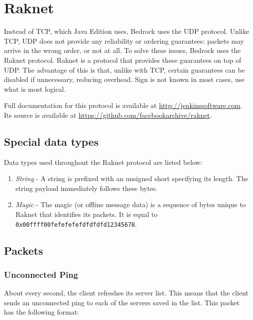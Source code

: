 \chapter{Raknet}\label{chap:raknet}

Instead of TCP, which Java Edition uses, Bedrock uses the UDP protocol.
Unlike TCP, UDP does not provide any reliability or ordering guarantees:
packets may arrive in the wrong order, or not at all. 
To solve these issues, Bedrock uses the Raknet protocol. 
Raknet is a protocol that provides these guarantees on top of UDP.
The advantage of this is that, unlike with TCP, certain guarantees can be disabled if unnecessary,
reducing overhead. Sign is not known in most cases, use what is most logical.

Full documentation for this protocol is available at \url{http://jenkinssoftware.com}.
Its source is available at \url{https://github.com/facebookarchive/raknet}.

\section{Special data types}\label{sec:raknet-types}

Data types used throughout the Raknet protocol are listed below:
\begin{enumerate}
    \item \textit{String} - A string is prefixed with an unsigned short specifying its length.
    The string payload immediately follows these bytes.

    \item \textit{Magic} - The magic (or offline message data) is a sequence of bytes unique to Raknet that identifies its packets.
    It is equal to \\
    \texttt{0x00ffff00fefefefefdfdfdfd12345678}.
\end{enumerate}

\section{Packets}\label{sec:raknet-packets}

\subsection{Unconnected Ping}\label{subsec:unconnected-ping}

About every second, the client refreshes its server list.
This means that the client sends an unconnected ping to each of the servers saved in the list.
This packet has the following format:

